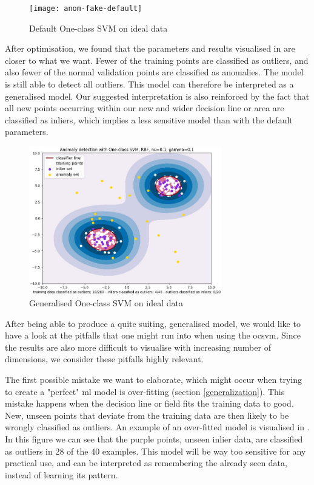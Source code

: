 \documentclass[english, a4paper]{report}
\begin{document}
{{{            \begin{figure}[H]
                \centering
                \texttt{[image: anom-fake-default]}
                \caption{Default One-class SVM on ideal data}
                \label{fig:defaultAD}
            \end{figure}
            
            After optimisation, we found that the parameters and results visualised in  are closer to what we want. Fewer of the training points are classified as outliers, and also fewer of the normal validation points are classified as anomalies. The model is still able to detect all outliers. This model can therefore be interpreted as a generalised model. Our suggested interpretation is also reinforced by the fact that all new points occurring within our new and wider decision line or area are classified as inliers, which implies a less sensitive model than with the default parameters.
            
            \begin{figure}[H]
                \centering
                \includegraphics[width=0.75\textwidth]{anom-fake-generalized}
                \caption{Generalised One-class SVM on ideal data}
                \label{fig:generalizedAD}
            \end{figure}
            
            After being able to produce a quite suiting, generalised model, we would like to have a look at the pitfalls that one might run into when using the \gls{ocsvm}. Since the results are also more difficult to visualise with increasing number of dimensions, we consider these pitfalls highly relevant.
            \par
            The first possible mistake we want to elaborate, which might occur when trying to create a "perfect" \gls{ml} model is over-fitting (section \ref{generalization}). This mistake happens when the decision line or field fits the training data to good. New, unseen points that deviate from the training data are then likely to be wrongly classified as outliers. An example of an over-fitted model is visualised in . In this figure we can see that the purple points, unseen inlier data, are classified as outliers in 28 of the 40 examples. This model will be way too sensitive for any practical use, and can be interpreted as remembering the already seen data, instead of learning its pattern. 
                
}}}
\end{document}
